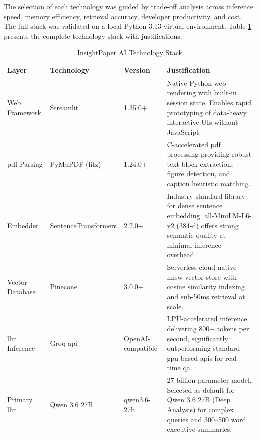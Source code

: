 The selection of each technology was guided by trade-off analysis across inference speed, memory efficiency, retrieval accuracy, developer productivity, and cost. The full stack was validated on a local Python 3.13 virtual environment. Table \ref{tab:stack} presents the complete technology stack with justifications.

\begin{table}[H]

\centering

\caption{InsightPaper AI Technology Stack}

\label{tab:stack}

\begin{tabular}{|p{2.5cm}|p{2.5cm}|p{1.5cm}|p{6cm}|}

\hline

\textbf{Layer} & \textbf{Technology} & \textbf{Version} & \textbf{Justification} \\

\hline

Web Framework & Streamlit & 1.35.0+ & Native Python web rendering with built-in session state. Enables rapid prototyping of data-heavy interactive UIs without JavaScript. \\

\hline

\gls{pdf} Parsing & PyMuPDF (fitz) & 1.24.0+ & C-accelerated \gls{pdf} processing providing robust text block extraction, figure detection, and caption heuristic matching. \\

\hline

Embedder & SentenceTransformers & 2.2.0+ & Industry-standard library for dense sentence embedding. all-MiniLM-L6-v2 (384-d) offers strong semantic quality at minimal inference overhead. \\

\hline

Vector Database & Pinecone & 3.0.0+ & Serverless cloud-native \gls{hnsw} vector store with cosine similarity indexing and sub-50ms retrieval at scale. \\

\hline

\gls{llm} Inference & Groq \gls{api} & OpenAI-compatible & LPU-accelerated inference delivering 800+ tokens per second, significantly outperforming standard \gls{gpu}-based \gls{api}s for real-time \gls{qa}. \\

\hline

Primary \gls{llm} & Qwen 3.6 27B & qwen3.6-27b & 27-billion parameter model. Selected as default for Qwen 3.6 27B (Deep Analysis) for complex queries and 300–500 word executive summaries. \\


\end{tabular}
\end{table}
